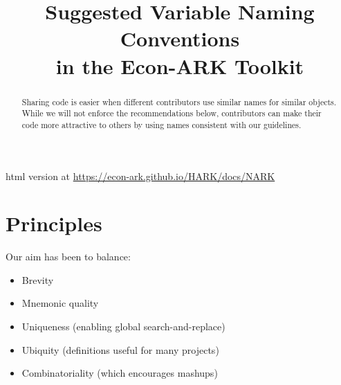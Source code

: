 \documentclass[12pt]{\econtex}
\begin{document}



\title{Suggested Variable Naming Conventions \\ in the Econ-ARK Toolkit}


\vspace{2in}



\maketitle


\begin{abstract}
  Sharing code is easier when different contributors use similar names for similar objects.  While we will not enforce the
  recommendations below, contributors can make their code more attractive to others
  by using names consistent with our guidelines.
\end{abstract}

\centerline{html version at \url{https://econ-ark.github.io/HARK/docs/NARK}}



\pagebreak

\section{Principles}
Our aim has been to balance:
\begin{itemize}
  \item Brevity
  \item Mnemonic quality
  \item Uniqueness (enabling global search-and-replace)
  \item Ubiquity (definitions useful for many projects)
  \item Combinatoriality (which encourages mashups)
\end{itemize}
\end{document}
